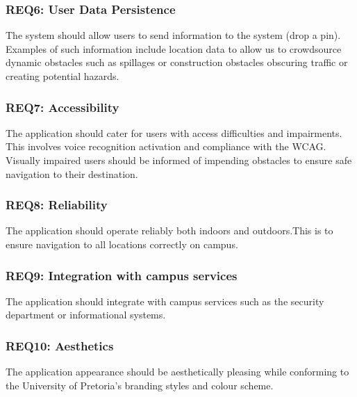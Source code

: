 \documentclass{article}
\begin{document}
		\subsubsection{REQ6: User Data Persistence}
			The system should allow users to send information to the system (drop a pin). Examples of such information include location data to allow us to crowdsource dynamic obstacles such as spillages or construction obstacles obscuring traffic or creating potential hazards.%
			
		\subsubsection{REQ7: Accessibility}
			The application should cater for users with access difficulties and impairments. This involves voice recognition activation and compliance with the WCAG.
			Visually impaired users should be informed of impending obstacles to ensure safe navigation to their destination.

		\subsubsection{REQ8: Reliability}
			The application should operate reliably both indoors and outdoors.This is to ensure navigation to all locations correctly on campus.
			
		\subsubsection{REQ9: Integration with campus services}
			The application should integrate with campus services such as the security department or informational systems.
			
		\subsubsection{REQ10: Aesthetics}
			The application appearance should be aesthetically pleasing while conforming to the University of Pretoria's branding styles and colour scheme.
%			
%			
\end{document}
